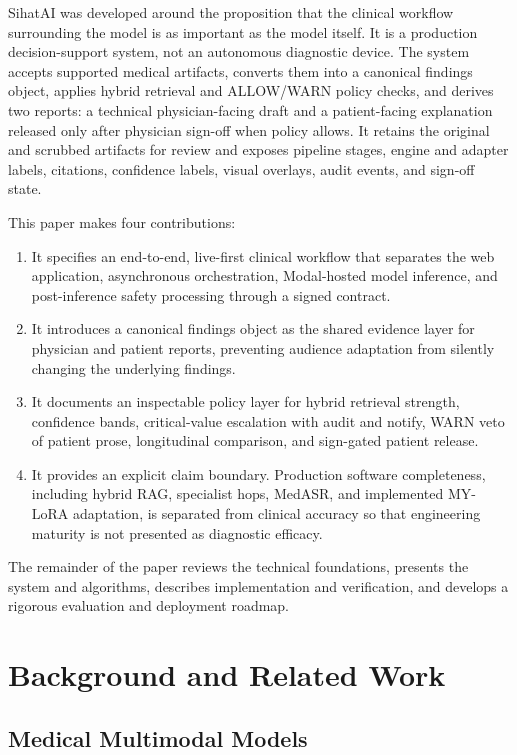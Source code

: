 \documentclass[conference]{IEEEtran}
\begin{document}
SihatAI was developed around the proposition that the clinical workflow surrounding the model is as important as the model itself. It is a production decision-support system, not an autonomous diagnostic device. The system accepts supported medical artifacts, converts them into a canonical findings object, applies hybrid retrieval and ALLOW/WARN policy checks, and derives two reports: a technical physician-facing draft and a patient-facing explanation released only after physician sign-off when policy allows. It retains the original and scrubbed artifacts for review and exposes pipeline stages, engine and adapter labels, citations, confidence labels, visual overlays, audit events, and sign-off state.

This paper makes four contributions:

\begin{enumerate}
    \item It specifies an end-to-end, live-first clinical workflow that separates the web application, asynchronous orchestration, Modal-hosted model inference, and post-inference safety processing through a signed contract.
    \item It introduces a canonical findings object as the shared evidence layer for physician and patient reports, preventing audience adaptation from silently changing the underlying findings.
    \item It documents an inspectable policy layer for hybrid retrieval strength, confidence bands, critical-value escalation with audit and notify, WARN veto of patient prose, longitudinal comparison, and sign-gated patient release.
    \item It provides an explicit claim boundary. Production software completeness, including hybrid RAG, specialist hops, MedASR, and implemented MY-LoRA adaptation, is separated from clinical accuracy so that engineering maturity is not presented as diagnostic efficacy.
\end{enumerate}

The remainder of the paper reviews the technical foundations, presents the system and algorithms, describes implementation and verification, and develops a rigorous evaluation and deployment roadmap.

\section{Background and Related Work}

\subsection{Medical Multimodal Models}
\end{document}
